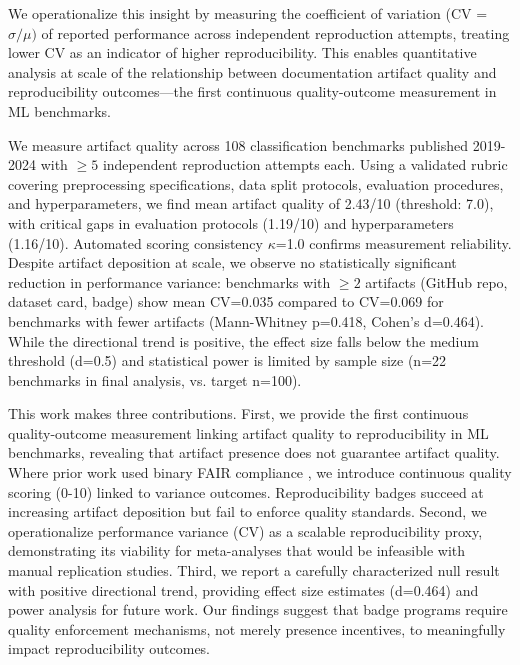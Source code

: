 We operationalize this insight by measuring the coefficient of variation (CV = $\sigma /\mu )$ of reported performance across independent reproduction attempts, treating lower CV as an indicator of higher reproducibility. This enables quantitative analysis at scale of the relationship between documentation artifact quality and reproducibility outcomes---the first continuous quality-outcome measurement in ML benchmarks.

We measure artifact quality across 108 classification benchmarks published 2019-2024 with $\geq 5$ independent reproduction attempts each. Using a validated rubric covering preprocessing specifications, data split protocols, evaluation procedures, and hyperparameters, we find mean artifact quality of 2.43/10 (threshold: 7.0), with critical gaps in evaluation protocols (1.19/10) and hyperparameters (1.16/10). Automated scoring consistency $\kappa$=1.0 confirms measurement reliability. Despite artifact deposition at scale, we observe no statistically significant reduction in performance variance: benchmarks with $\geq 2$ artifacts (GitHub repo, dataset card, badge) show mean CV=0.035 compared to CV=0.069 for benchmarks with fewer artifacts (Mann-Whitney p=0.418, Cohen's d=0.464). While the directional trend is positive, the effect size falls below the medium threshold (d=0.5) and statistical power is limited by sample size (n=22 benchmarks in final analysis, vs. target n=100).

This work makes three contributions. First, we provide the first continuous quality-outcome measurement linking artifact quality to reproducibility in ML benchmarks, revealing that artifact presence does not guarantee artifact quality. Where prior work used binary FAIR compliance \citep{Gim2025}, we introduce continuous quality scoring (0-10) linked to variance outcomes. Reproducibility badges succeed at increasing artifact deposition but fail to enforce quality standards. Second, we operationalize performance variance (CV) as a scalable reproducibility proxy, demonstrating its viability for meta-analyses that would be infeasible with manual replication studies. Third, we report a carefully characterized null result with positive directional trend, providing effect size estimates (d=0.464) and power analysis for future work. Our findings suggest that badge programs require quality enforcement mechanisms, not merely presence incentives, to meaningfully impact reproducibility outcomes.
